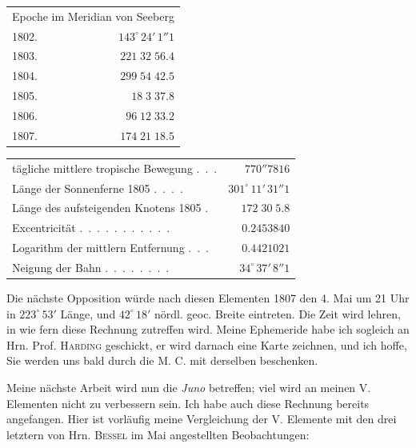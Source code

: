 \begin{center}\begingroup
\fontsize{9}{11}\selectfont
\setlength{\tabcolsep}{2pt}\renewcommand{\arraystretch}{1.12}
\begin{tabular}{lr}
\multicolumn{2}{c}{Epoche im Meridian von Seeberg} \\
1802. & $143^\circ\,24'\,1''1$ \\
1803. & $221\;32\;56.4$ \\
1804. & $299\;54\;42.5$ \\
1805. & $18\;3\;37.8$ \\
1806. & $96\;12\;33.2$ \\
1807. & $174\;21\;18.5$ \\
\end{tabular}\endgroup\end{center}
\begin{center}\begingroup
\fontsize{9}{11}\selectfont
\setlength{\tabcolsep}{2pt}\renewcommand{\arraystretch}{1.12}
\begin{tabular}{lr}
tägliche mittlere tropische Bewegung .\ .\ . & $770''7816$ \\
Länge der Sonnenferne 1805 .\ .\ .\ . & $301^\circ\,11'\,31''1$ \\
Länge des aufsteigenden Knotens 1805 . & $172\;30\;5.8$ \\
Excentricität .\ .\ .\ .\ .\ .\ .\ .\ .\ .\ . & $0.2453840$ \\
Logarithm der mittlern Entfernung .\ .\ . & $0.4421021$ \\
Neigung der Bahn .\ .\ .\ .\ .\ .\ .\ . & $34^\circ\,37'\,8''1$ \\
\end{tabular}\endgroup\end{center}

\par\indent Die nächste Opposition würde nach diesen Elementen 1807 den 4. Mai um 21 Uhr in $223^\circ\,53'$ Länge,
und $42^\circ\,18'$ nördl. geoc. Breite eintreten. Die Zeit wird lehren, in wie fern diese Rechnung zutreffen
wird. Meine Ephemeride habe ich sogleich an Hrn. Prof. \textsc{Harding} geschickt, er wird darnach eine
Karte zeichnen, und ich hoffe, Sie werden uns bald durch die M. C. mit derselben beschenken.
%
\par\indent Meine nächste Arbeit wird nun die \emph{Juno} betreffen; viel wird an meinen V. Elementen nicht zu
verbessern sein. Ich habe auch diese Rechnung bereits angefangen. Hier ist vorläufig meine Vergleichung der V. Elemente mit den drei letztern von Hrn. \textsc{Bessel} im Mai angestellten Beobachtungen:

